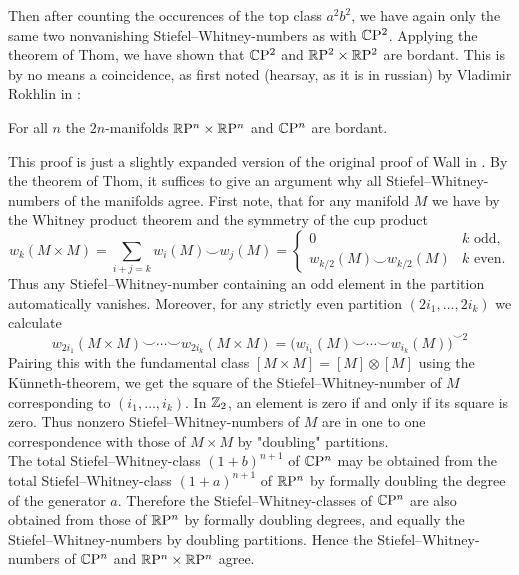 Then after counting the occurences of the top class $a^2b^2$, we have again only the same two nonvanishing Stiefel--Whitney-numbers as with $\mathbb{C}\mathrm{P}^2$.
Applying the theorem of Thom, we have shown that $\mathbb{C}\mathrm{P}^2$ and $\mathbb{R}\mathrm{P}^2 \times \mathbb{R}\mathrm{P}^2$ are bordant.
This is by no means a coincidence, as first noted (hearsay, as it is in russian) by Vladimir Rokhlin in \cite{rokhlin:bord}:
\begin{thesislemma}\label{rokhlintrick}
    For all $n$ the $2n$-manifolds $\mathbb{R}\mathrm{P}^n \times \mathbb{R}\mathrm{P}^n$ and $\mathbb{C}\mathrm{P}^n$ are bordant.
\end{thesislemma}
\prf
This proof is just a slightly expanded version of the original proof of Wall in \cite{wall:bord}.
By the theorem of Thom, it suffices to give an argument why all Stiefel--Whitney-numbers of the manifolds agree.
First note, that for any manifold $M$ we have by the Whitney product theorem and the symmetry of the cup product
\begin{equation*}
    w_k(M\times M) = \sum\limits_{i + j = k} w_i(M)\smile w_j(M) = 
    \begin{cases} 0 & k \text{ odd,} \\ w_{k/2}(M) \smile w_{k/2}(M) & k \text{ even.} \end{cases}
\end{equation*}
Thus any Stiefel--Whitney-number containing an odd element in the partition automatically vanishes.
Moreover, for any strictly even partition $(2i_1,\dots ,2i_k)$ we calculate
\begin{equation*}
    w_{2i_1}(M\times M)\smile \cdots \smile w_{2i_k}(M\times M)
    = \big(w_{i_1}(M) \smile \cdots \smile w_{i_k}(M)\big)^{\smile 2} 
\end{equation*}
Pairing this with the fundamental class $[M\times M] = [M]\otimes [M]$ using the Künneth-theorem, we get the square of the Stiefel--Whitney-number of $M$ corresponding to $(i_1,\dots ,i_k)$.
In $\mathbb{Z}_2$, an element is zero if and only if its square is zero.
Thus nonzero Stiefel--Whitney-numbers of $M$ are in one to one correspondence with those of $M\times M$ by "doubling" partitions.\\
The total Stiefel--Whitney-class $(1 + b)^{n+1}$ of $\mathbb{C}\mathrm{P}^n$ may be obtained from the total Stiefel--Whitney-class $(1+a)^{n+1}$ of $\mathbb{R}\mathrm{P}^n$ by formally doubling the degree of the generator $a$.
Therefore the Stiefel--Whitney-classes of $\mathbb{C}\mathrm{P}^n$ are also obtained from those of $\mathbb{R}\mathrm{P}^n$ by formally doubling degrees, and equally the Stiefel--Whitney-numbers by doubling partitions.
Hence the Stiefel--Whitney-numbers of $\mathbb{C}\mathrm{P}^n$ and $\mathbb{R}\mathrm{P}^n\times\mathbb{R}\mathrm{P}^n$ agree.
